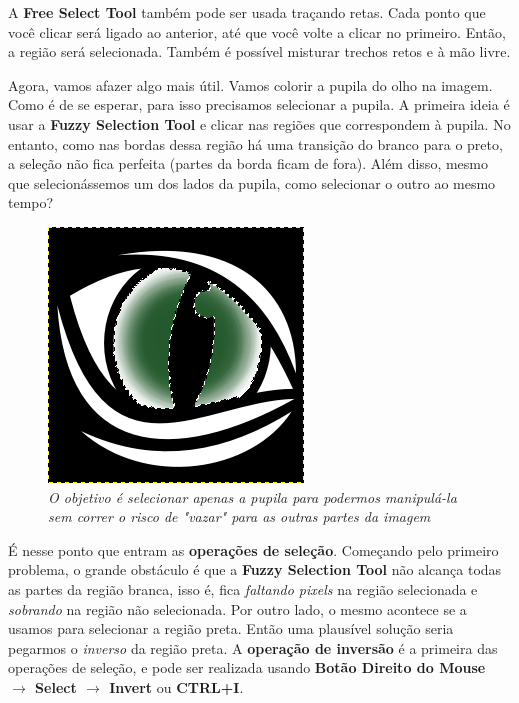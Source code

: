 \documentclass[12pt,onecolumn]{article}
\begin{document}
    \begin{framed}
      A {\bf Free Select Tool} também pode ser usada traçando retas. Cada ponto
      que você clicar será ligado ao anterior, até que você volte a clicar no
      primeiro. Então, a região será selecionada. Também é possível misturar
      trechos retos e à mão livre.
    \end{framed}
  
    Agora, vamos afazer algo mais útil. Vamos colorir a pupila do olho na
    imagem. Como é de se esperar, para isso precisamos selecionar a pupila. A
    primeira ideia é usar a {\bf Fuzzy Selection Tool} e clicar nas regiões que
    correspondem à pupila. No entanto, como nas bordas dessa região há uma
    transição do branco para o preto, a seleção não fica perfeita (partes da
    borda ficam de fora). Além disso, mesmo que selecionássemos um dos lados da
    pupila, como selecionar o outro ao mesmo tempo?
    
    \begin{figure}[h]
      \centering
      \includegraphics[width=.5\textwidth]{screenshots/04-pupil.png}
      \caption{
        \footnotesize
        \it
        O objetivo é selecionar apenas a pupila para podermos manipulá-la sem
        correr o risco de "vazar" para as outras partes da imagem
      }
      \label{fig:pupil}
    \end{figure}
    
    É nesse ponto que entram as {\bf operações de seleção}. Começando pelo
    primeiro problema, o grande obstáculo é que a {\bf Fuzzy Selection Tool} não
    alcança todas as partes da região branca, isso é, fica {\it faltando pixels}
    na região selecionada e {\it sobrando} na região não selecionada. Por outro
    lado, o mesmo acontece se a usamos para selecionar a região preta. Então uma
    plausível solução seria pegarmos o {\it inverso} da região preta. A {\bf
    operação de inversão} é a primeira das operações de seleção, e pode ser
    realizada usando {\bf Botão Direito do Mouse $\rightarrow$ Select
    $\rightarrow$ Invert} ou {\bf CTRL+I}.
    
\end{document}
